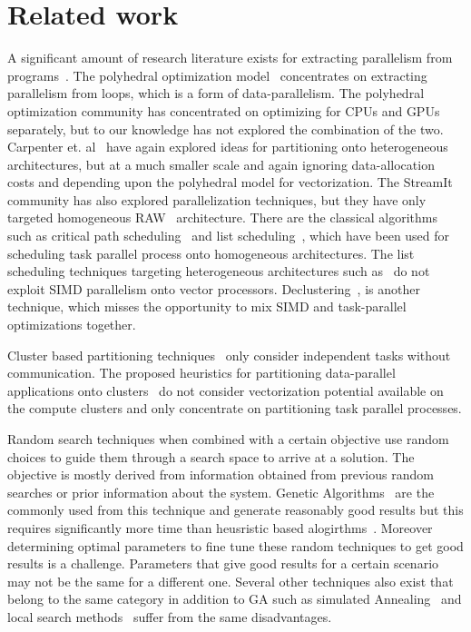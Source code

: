 \section{Related work}
\label{sec:related-work}

A significant amount of research literature exists for extracting
parallelism from programs~\cite{mgri98,jdon06,mgor06,gsih93,pcar09}. The
polyhedral optimization model~\cite{mgri98} concentrates on extracting
parallelism from loops, which is a form of data-parallelism. The
polyhedral optimization community has concentrated on optimizing for
CPUs and GPUs separately, but to our knowledge has not explored the
combination of the two. Carpenter et. al~\cite{pcar09} have again
explored ideas for partitioning onto heterogeneous architectures, but at
a much smaller scale and again ignoring data-allocation costs and
depending upon the polyhedral model for vectorization. The
StreamIt~\cite{wthi02} community has also explored parallelization
techniques, but they have only targeted homogeneous RAW~\cite{ewai97}
architecture. There are the classical algorithms such as critical path
scheduling~\cite{Kohler1975} and list scheduling~\cite{atho74}, which
have been used for scheduling task parallel process onto homogeneous
architectures. The list scheduling techniques targeting heterogeneous
architectures such as~\cite{htop02} do not exploit SIMD parallelism onto
vector processors. Declustering~\cite{gsih93}, is another technique,
which misses the opportunity to mix SIMD and task-parallel optimizations
together.

Cluster based partitioning techniques~\cite{mmah99,adou04,tbra01} only
consider independent tasks without communication. The proposed
heuristics for partitioning data-parallel applications onto
clusters~\cite{ssan05,skum02} do not consider vectorization potential
available on the compute clusters and only concentrate on partitioning
task parallel processes.

Random search techniques when combined with a certain objective use random
choices to guide them through a search space to arrive at a solution. The
objective is mostly derived from information obtained from previous random
searches or prior information about the system. Genetic Algorithms~\cite{} are the
commonly used from this technique and generate reasonably good results but
this requires significantly more time than heusristic based
alogirthms~\cite{}. Moreover determining optimal parameters to fine tune these
random techniques to get good results is a challenge. Parameters that give
good results for a certain scenario may not be the same for a different one.
Several other techniques also exist that belong to the same category in
addition to GA such as simulated Annealing~\cite{} and local search
methods~\cite{} suffer from the same disadvantages.




